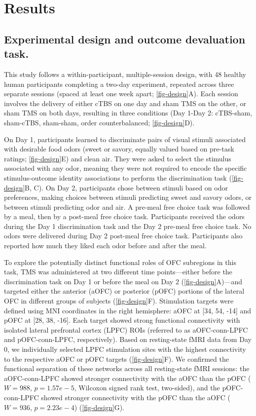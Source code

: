 \documentclass[lineno,sn-basic]{sn-jnl}%
\begin{document}
\section{Results}
\label{sec-res}

\subsection{Experimental design and outcome devaluation task.}
\label{subsec-design}


This study follows a within-participant, multiple-session design, with 48 healthy human participants completing a two-day experiment, repeated across three separate sessions (spaced at least one week apart; \autoref{fig-design}A). Each session involves the delivery of either cTBS on one day and sham TMS on the other, or sham TMS on both days, resulting in three conditions (Day 1-Day 2: cTBS-sham, sham-cTBS, sham-sham, order counterbalanced; \autoref{fig-design}D). 

On Day 1, participants learned to discriminate pairs of visual stimuli associated with desirable food odors (sweet or savory, equally valued based on pre-task ratings; \autoref{fig-design}E) and clean air. They were asked to select the stimulus associated with any odor, meaning they were not required to encode the specific stimulus-outcome identity associations to perform the discrimination task (\autoref{fig-design}B, C). On Day 2, participants chose between stimuli based on odor preferences, making choices between stimuli predicting sweet and savory odors, or between stimuli predicting odor and air. A pre-meal free choice task was followed by a meal, then by a post-meal free choice task. Participants received the odors during the Day 1 discrimination task and the Day 2 pre-meal free choice task. No odors were delivered during Day 2 post-meal free choice task. Participants also reported how much they liked each odor before and after the meal. 

To explore the potentially distinct functional roles of OFC subregions in this task, TMS was administered at two different time points---either before the discrimination task on Day 1 or before the meal on Day 2 (\autoref{fig-design}A)---and targeted either the anterior (aOFC) or posterior (pOFC) portions of the lateral OFC in different groups of subjects (\autoref{fig-design}F). Stimulation targets were defined using MNI coordinates in the right hemisphere: aOFC at {[}34, 54, -14{]} and pOFC at {[}28, 38, -16{]}. Each target showed strong functional connectivity with isolated lateral prefrontal cortex (LPFC) ROIs (referred to as aOFC-conn-LPFC and pOFC-conn-LPFC, respectively). Based on resting-state fMRI data from Day 0, we individually selected LPFC stimulation sites
with the highest connectivity to the respective aOFC or pOFC targets (\autoref{fig-design}F). We confirmed the functional separation of these networks across all resting-state fMRI sessions: the aOFC-conn-LPFC showed stronger connectivity with the aOFC than the pOFC ($W = 988$, $p = 1.57e-5$, Wilcoxon signed rank test, two-sided), and the pOFC-conn-LPFC showed stronger connectivity with the pOFC than the aOFC ($W = 936$, $p = 2.23e-4$) (\autoref{fig-design}G).
\end{document}
